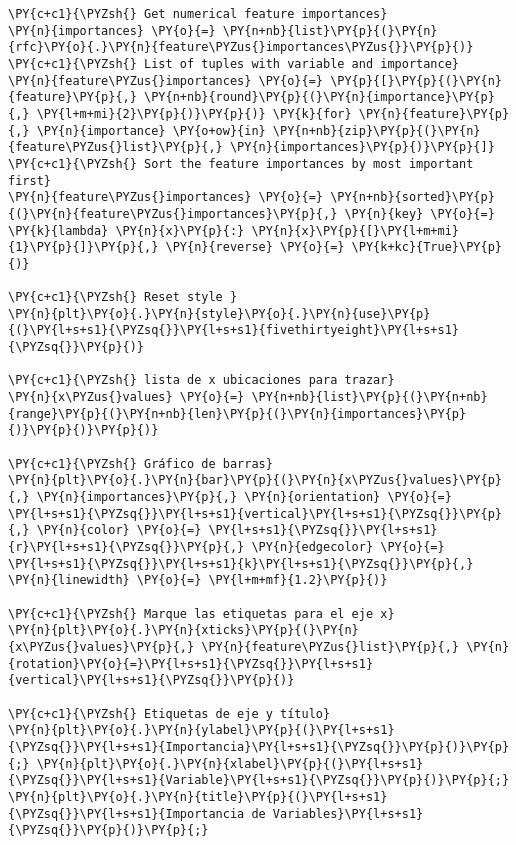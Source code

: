     \begin{tcolorbox}[breakable, size=fbox, boxrule=1pt, pad at break*=1mm,colback=cellbackground, colframe=cellborder]
\begin{Verbatim}[commandchars=\\\{\}]
\PY{c+c1}{\PYZsh{} Get numerical feature importances}
\PY{n}{importances} \PY{o}{=} \PY{n+nb}{list}\PY{p}{(}\PY{n}{rfc}\PY{o}{.}\PY{n}{feature\PYZus{}importances\PYZus{}}\PY{p}{)}
\PY{c+c1}{\PYZsh{} List of tuples with variable and importance}
\PY{n}{feature\PYZus{}importances} \PY{o}{=} \PY{p}{[}\PY{p}{(}\PY{n}{feature}\PY{p}{,} \PY{n+nb}{round}\PY{p}{(}\PY{n}{importance}\PY{p}{,} \PY{l+m+mi}{2}\PY{p}{)}\PY{p}{)} \PY{k}{for} \PY{n}{feature}\PY{p}{,} \PY{n}{importance} \PY{o+ow}{in} \PY{n+nb}{zip}\PY{p}{(}\PY{n}{feature\PYZus{}list}\PY{p}{,} \PY{n}{importances}\PY{p}{)}\PY{p}{]}
\PY{c+c1}{\PYZsh{} Sort the feature importances by most important first}
\PY{n}{feature\PYZus{}importances} \PY{o}{=} \PY{n+nb}{sorted}\PY{p}{(}\PY{n}{feature\PYZus{}importances}\PY{p}{,} \PY{n}{key} \PY{o}{=} \PY{k}{lambda} \PY{n}{x}\PY{p}{:} \PY{n}{x}\PY{p}{[}\PY{l+m+mi}{1}\PY{p}{]}\PY{p}{,} \PY{n}{reverse} \PY{o}{=} \PY{k+kc}{True}\PY{p}{)}

\PY{c+c1}{\PYZsh{} Reset style }
\PY{n}{plt}\PY{o}{.}\PY{n}{style}\PY{o}{.}\PY{n}{use}\PY{p}{(}\PY{l+s+s1}{\PYZsq{}}\PY{l+s+s1}{fivethirtyeight}\PY{l+s+s1}{\PYZsq{}}\PY{p}{)}

\PY{c+c1}{\PYZsh{} lista de x ubicaciones para trazar}
\PY{n}{x\PYZus{}values} \PY{o}{=} \PY{n+nb}{list}\PY{p}{(}\PY{n+nb}{range}\PY{p}{(}\PY{n+nb}{len}\PY{p}{(}\PY{n}{importances}\PY{p}{)}\PY{p}{)}\PY{p}{)}

\PY{c+c1}{\PYZsh{} Gráfico de barras}
\PY{n}{plt}\PY{o}{.}\PY{n}{bar}\PY{p}{(}\PY{n}{x\PYZus{}values}\PY{p}{,} \PY{n}{importances}\PY{p}{,} \PY{n}{orientation} \PY{o}{=} \PY{l+s+s1}{\PYZsq{}}\PY{l+s+s1}{vertical}\PY{l+s+s1}{\PYZsq{}}\PY{p}{,} \PY{n}{color} \PY{o}{=} \PY{l+s+s1}{\PYZsq{}}\PY{l+s+s1}{r}\PY{l+s+s1}{\PYZsq{}}\PY{p}{,} \PY{n}{edgecolor} \PY{o}{=} \PY{l+s+s1}{\PYZsq{}}\PY{l+s+s1}{k}\PY{l+s+s1}{\PYZsq{}}\PY{p}{,} \PY{n}{linewidth} \PY{o}{=} \PY{l+m+mf}{1.2}\PY{p}{)}

\PY{c+c1}{\PYZsh{} Marque las etiquetas para el eje x}
\PY{n}{plt}\PY{o}{.}\PY{n}{xticks}\PY{p}{(}\PY{n}{x\PYZus{}values}\PY{p}{,} \PY{n}{feature\PYZus{}list}\PY{p}{,} \PY{n}{rotation}\PY{o}{=}\PY{l+s+s1}{\PYZsq{}}\PY{l+s+s1}{vertical}\PY{l+s+s1}{\PYZsq{}}\PY{p}{)}

\PY{c+c1}{\PYZsh{} Etiquetas de eje y título}
\PY{n}{plt}\PY{o}{.}\PY{n}{ylabel}\PY{p}{(}\PY{l+s+s1}{\PYZsq{}}\PY{l+s+s1}{Importancia}\PY{l+s+s1}{\PYZsq{}}\PY{p}{)}\PY{p}{;} \PY{n}{plt}\PY{o}{.}\PY{n}{xlabel}\PY{p}{(}\PY{l+s+s1}{\PYZsq{}}\PY{l+s+s1}{Variable}\PY{l+s+s1}{\PYZsq{}}\PY{p}{)}\PY{p}{;} \PY{n}{plt}\PY{o}{.}\PY{n}{title}\PY{p}{(}\PY{l+s+s1}{\PYZsq{}}\PY{l+s+s1}{Importancia de Variables}\PY{l+s+s1}{\PYZsq{}}\PY{p}{)}\PY{p}{;}
\end{Verbatim}
\end{tcolorbox}

